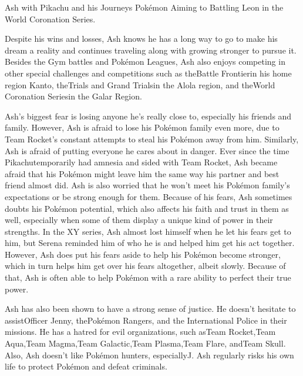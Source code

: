 \documentclass[a4paper,12pt]{article}
\begin{document}
Ash with Pikachu and his Journeys Pokémon Aiming to Battling Leon in the World Coronation Series.\\ \par \vspace{0.5cm}

Despite his wins and losses, Ash knows he has a long way to go to make his dream a reality and continues traveling along with growing stronger to pursue it. Besides the Gym battles and Pokémon Leagues, Ash also enjoys competing in other special challenges and competitions such as theBattle Frontierin his home region Kanto, theTrials and Grand Trialsin the Alola region, and theWorld Coronation Seriesin the Galar Region.\\ \par \vspace{0.5cm}

Ash's biggest fear is losing anyone he's really close to, especially his friends and family. However, Ash is afraid to lose his Pokémon family even more, due to Team Rocket's constant attempts to steal his Pokémon away from him. Similarly, Ash is afraid of putting everyone he cares about in danger. Ever since the time Pikachutemporarily had amnesia and sided with Team Rocket, Ash became afraid that his Pokémon might leave him the same way his partner and best friend almost did. Ash is also worried that he won't meet his Pokémon family's expectations or be strong enough for them. Because of his fears, Ash sometimes doubts his Pokémon potential, which also affects his faith and trust in them as well, especially when some of them display a unique kind of power in their strengths. In the XY series, Ash almost lost himself when he let his fears get to him, but Serena reminded him of who he is and helped him get his act together. However, Ash does put his fears aside to help his Pokémon become stronger, which in turn helps him get over his fears altogether, albeit slowly. Because of that, Ash is often able to help Pokémon with a rare ability to perfect their true power.\\ \par \vspace{0.5cm}

Ash has also been shown to have a strong sense of justice. He doesn't hesitate to assistOfficer Jenny, thePokémon Rangers, and the International Police in their missions. He has a hatred for evil organizations, such asTeam Rocket,Team Aqua,Team Magma,Team Galactic,Team Plasma,Team Flare, andTeam Skull. Also, Ash doesn't like Pokémon hunters, especiallyJ. Ash regularly risks his own life to protect Pokémon and defeat criminals.\\ \par \vspace{0.5cm}
\end{document}

